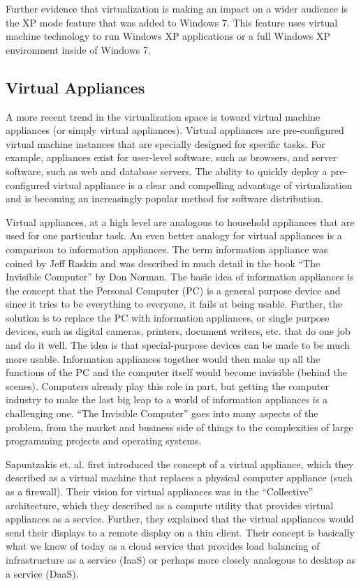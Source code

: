 Further evidence that virtualization is making an impact on a wider audience is the XP mode feature that was added to Windows 7. This feature uses virtual machine technology to run Windows XP applications or a full Windows XP environment inside of Windows 7\cite{windows_xp_mode}. 

\subsection{Virtual Appliances}
\label{VirtualAppliances}

A more recent trend in the virtualization space is toward virtual machine appliances (or simply virtual appliances). Virtual appliances are pre-configured virtual machine instances that are specially designed for specific tasks. For example, appliances exist for user-level software, such as browsers, and server software, such as web and database servers. The ability to quickly deploy a pre-configured virtual appliance is a clear and compelling advantage of virtualization and is becoming an increasingly popular method for software distribution.

Virtual appliances, at a high level are analogous to household appliances that are used for one particular task. An even better analogy for virtual appliances is a comparison to information appliances. The term information appliance was coined by Jeff Raskin and was described in much detail in the book ``The Invisible Computer'' by Don Norman\cite{norman_1999}. The basic idea of information appliances is the concept that the Personal Computer (PC) is a general purpose device and since it tries to be everything to everyone, it fails at being usable. Further, the solution is to replace the PC with information appliances, or single purpose devices, such as digital cameras, printers, document writers, etc. that do one job and do it well. The idea is that special-purpose devices can be made to be much more usable. Information appliances together would then make up all the functions of the PC and the computer itself would become invisible (behind the scenes). Computers already play this role in part, but getting the computer industry to make the last big leap to a world of information appliances is a challenging one. ``The Invisible Computer'' goes into many aspects of the problem, from the market and business side of things to the complexities of large programming projects and operating systems.

Sapuntzakis et. al. first introduced the concept of a virtual appliance\cite{sapuntzakis_2003}, which they described as a virtual machine that replaces a physical computer appliance (such as a firewall). Their vision for virtual appliances was in the ``Collective'' architecture, which they described as a compute utility that provides virtual appliances as a service. Further, they explained that the virtual appliances would send their displays to a remote display on a thin client. Their concept is basically what we know of today as a cloud service that provides load balancing of infrastructure as a service (IaaS) or perhaps more closely analogous to desktop as a service (DaaS).

